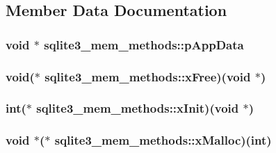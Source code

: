 \subsection{Member Data Documentation}
\hypertarget{structsqlite3__mem__methods_af91b7adfa1f6aace0b129bac800bd444}{
\subsubsection[{p\-App\-Data}]{\setlength{\rightskip}{0pt plus 5cm}void $\ast$ sqlite3\-\_\-mem\-\_\-methods\-::p\-App\-Data}}\label{structsqlite3__mem__methods_af91b7adfa1f6aace0b129bac800bd444}
\hypertarget{structsqlite3__mem__methods_aa2e7fe8d030adaa17fd23a44fec1eca1}{
\subsubsection[{x\-Free}]{\setlength{\rightskip}{0pt plus 5cm}void($\ast$ sqlite3\-\_\-mem\-\_\-methods\-::x\-Free)(void $\ast$)}}\label{structsqlite3__mem__methods_aa2e7fe8d030adaa17fd23a44fec1eca1}
\hypertarget{structsqlite3__mem__methods_ad0997b548928358d655000b6ac825cf4}{
\subsubsection[{x\-Init}]{\setlength{\rightskip}{0pt plus 5cm}int($\ast$ sqlite3\-\_\-mem\-\_\-methods\-::x\-Init)(void $\ast$)}}\label{structsqlite3__mem__methods_ad0997b548928358d655000b6ac825cf4}
\hypertarget{structsqlite3__mem__methods_acb9151cf501c851b61ab6b378832b159}{
\subsubsection[{x\-Malloc}]{\setlength{\rightskip}{0pt plus 5cm}void $\ast$($\ast$ sqlite3\-\_\-mem\-\_\-methods\-::x\-Malloc)(int)}}\label{structsqlite3__mem__methods_acb9151cf501c851b61ab6b378832b159}
